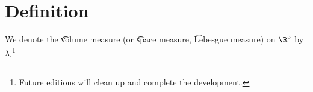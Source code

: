
\section*{Definition}

We denote the \t{volume measure} (or \t{space measure}, \t{Lebesgue measure}) on $\R ^3$ by $\lambda $.\footnote{Future editions will clean up and complete the development.}

\blankpage